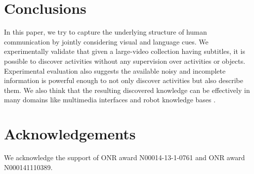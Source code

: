 

\section{Conclusions}
\vspace{-2mm}
In this paper, we try to capture the underlying structure of human communication by jointly considering visual and language cues. We experimentally validate that given a large-video collection having subtitles, it is possible to discover activities without any supervision over activities or objects. Experimental evaluation also suggests the available noisy and incomplete information is powerful enough to not only discover activities but also describe them. We also think that the resulting discovered knowledge can be effectively in many domains like multimedia interfaces and robot knowledge bases \cite{robobrain}. 
\vspace{-2mm}
\section{Acknowledgements}
\vspace{-2mm}
We acknowledge the support of ONR award N00014-13-1-0761 and ONR award N000141110389.
\vspace{-2mm}
